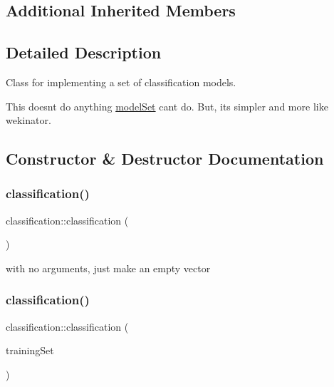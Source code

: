 \subsection*{Additional Inherited Members}


\subsection{Detailed Description}
Class for implementing a set of classification models.

This doesn\textquotesingle{}t do anything \hyperlink{classmodel_set}{model\+Set} can\textquotesingle{}t do. But, it\textquotesingle{}s simpler and more like wekinator. 

\subsection{Constructor \& Destructor Documentation}
\mbox{\label{classclassification_a96cfefed3bbc9b8b61a44b9c6cc9e29a}} 
\subsubsection{\texorpdfstring{classification()}{classification()}\hspace{0.1cm}{\footnotesize\ttfamily [1/3]}}
{\footnotesize\ttfamily classification\+::classification (\begin{DoxyParamCaption}{ }\end{DoxyParamCaption})}

with no arguments, just make an empty vector \mbox{\label{classclassification_a825ef0d6ba9ba826d22969be72a9011f}} 
\subsubsection{\texorpdfstring{classification()}{classification()}\hspace{0.1cm}{\footnotesize\ttfamily [2/3]}}
{\footnotesize\ttfamily classification\+::classification (\begin{DoxyParamCaption}\item[{std\+::vector$<$ \hyperlink{structtraining_example}{training\+Example} $>$}]{training\+Set }\end{DoxyParamCaption})}

